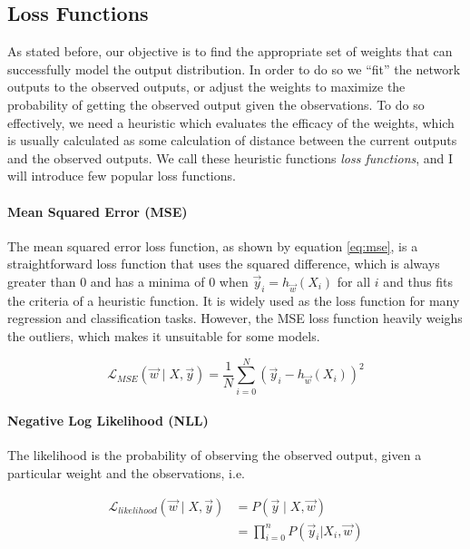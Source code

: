 \documentclass[12pt,a4paper,]{report}
\begin{document}
\hypertarget{loss-functions}{%
\subsection{Loss Functions}\label{loss-functions}}

As stated before, our objective is to find the appropriate set of
weights that can successfully model the output distribution. In order to
do so we ``fit'' the network outputs to the observed outputs, or adjust
the weights to maximize the probability of getting the observed output
given the observations. To do so effectively, we need a heuristic which
evaluates the efficacy of the weights, which is usually calculated as
some calculation of distance between the current outputs and the
observed outputs. We call these heuristic functions \emph{loss
functions}, and I will introduce few popular loss functions.

\paragraph{Mean Squared Error (MSE)}

The mean squared error loss function, as shown by equation \ref{eq:mse},
is a straightforward loss function that uses the squared difference,
which is always greater than 0 and has a minima of 0 when
\(\vec{y}_i = h_{\vec{w}}(X_i)\) for all \(i\) and thus fits the
criteria of a heuristic function. It is widely used as the loss function
for many regression and classification tasks. However, the MSE loss
function heavily weighs the outliers, which makes it unsuitable for some
models.

\begin{equation}
    \mathcal{L}_{MSE}(\vec{w} \mid X, \vec{y}) = \frac{1}{N} \sum_{i = 0}^{N} (\vec{y}_i - h_{\vec{w}}(X_i))^2 \label{eq:mse}
\end{equation}

\paragraph{Negative Log Likelihood (NLL)}

The likelihood is the probability of observing the observed output,
given a particular weight and the observations, i.e.

\begin{align}
    \mathcal{L}_{likelihood}(\vec{w} \mid X, \vec{y}) &= P(\vec{y} \mid X, \vec{w}) \\
    &= \prod_{i = 0}^{n} P(\vec{y}_i |  X_i, \vec{w}) \label{eq:nllprod}
\end{align}
\end{document}
